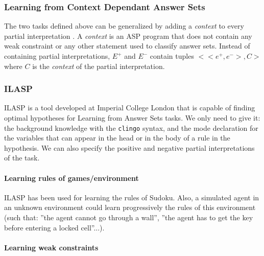 \subsubsection{Learning from Context Dependant Answer Sets}

The two tasks defined above can be generalized by adding a \textit{context} to every partial interpretation \citep{law2016context}. A \textit{context} is an ASP program that does not contain any weak constraint or any other statement used to classify answer sets. Instead of containing partial interpretations, $E^+$ and $E^-$ contain tuples $<<e^+,e^->,C>$ where $C$ is the \textit{context} of the partial interpretation.  

\begin{definition}

\end{definition}

\begin{example}

\end{example}

\subsubsection{ILASP}

ILASP is a tool developed at Imperial College London that is capable of finding optimal hypotheses for Learning from Answer Sets tasks. We only need to give it: the background knowledge with the \texttt{clingo} syntax, and the mode declaration for the variables that can appear in the head or in the body of a rule in the hypothesis. We can also specify the positive and negative partial interpretations of the task.

\paragraph{Learning rules of games/environment}

ILASP has been used for learning the rules of Sudoku. Also, a simulated agent in an unknown environment could learn progressively the rules of this environment (such that: ”the agent cannot go through a wall”, ”the agent has to get the key before entering a locked cell”...).

\paragraph{Learning weak constraints}

